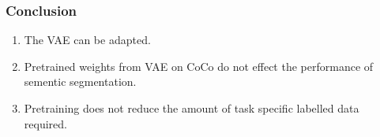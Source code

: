 \documentclass[t,aspectratio=169]{beamer}
\begin{document}
\begin{frame}
  \frametitle{Conclusion}
  \begin{enumerate}
    \pause
    \item The VAE can be adapted.
          \pause
    \item Pretrained weights from VAE on CoCo do not effect the performance of sementic segmentation.
          \pause
    \item Pretraining does not reduce the amount of task specific labelled data required.
  \end{enumerate}
  
  
\end{frame}
\end{document}
